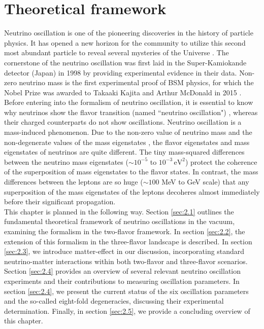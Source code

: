 \chapter{Theoretical framework}
\label{C2} 
Neutrino oscillation is one of the pioneering discoveries in the history of particle physics. It has opened a new horizon for the community to utilize this second most abundant particle to reveal several mysteries of the Universe \cite{Tamborra:2024fcd}. The cornerstone of the neutrino oscillation was first laid in the Super-Kamiokande detector (Japan) in 1998 \cite{Super-Kamiokande:1998kpq} by providing experimental evidence in their data. Non-zero neutrino mass is the first experimental proof of BSM physics, for which the Nobel Prize was awarded to Takaaki Kajita and Arthur McDonald in 2015 \cite{Kajita:2016cak, McDonald:2016ixn}.\\
Before entering into the formalism of neutrino oscillation, it is essential to know why neutrinos show the flavor transition (named ``neutrino oscillation") \cite{Rajasekaran:2000nn, Agarwalla:2008jin}, whereas their charged counterparts do not show oscillations. Neutrino oscillation is a mass-induced phenomenon. Due to the non-zero value of neutrino mass and the non-degenerate values of the mass eigenstates \cite{Raychaudhuri:2000zn}, the flavor eigenstates and mass eigenstates of neutrinos are quite different. The tiny mass-squared differences between the neutrino mass eigenstates ($\sim 10^{-5}$ to $10^{-3} \, \mathrm{eV}^2$) protect the coherence of the superposition \cite{LIPKIN2004355, Ravari:2022yfd} of mass eigenstates to the flavor states. In contrast, the mass differences between the leptons are so huge ($\sim 100$ MeV to GeV scale) that any superposition of the mass eigenstates of the leptons decoheres almost immediately before their significant propagation.\\
This chapter is planned in the following way. Section \ref{sec:2.1} outlines the fundamental theoretical framework of neutrino oscillations in the vacuum, examining the formalism in the two-flavor framework. In section \ref{sec:2.2}, the extension of this formalism in the three-flavor landscape is described. In section \ref{sec:2.3}, we introduce matter-effect in our discussion, incorporating standard neutrino-matter interactions within both two-flavor and three-flavor scenarios. Section \ref{sec:2.4} provides an overview of several relevant neutrino oscillation experiments and their contributions to measuring oscillation parameters. In section \ref{sec:2.4}, we present the current status of the six oscillation parameters and the so-called eight-fold degeneracies, discussing their experimental determination. Finally, in section \ref{sec:2.5}, we provide a concluding overview of this chapter.\\

